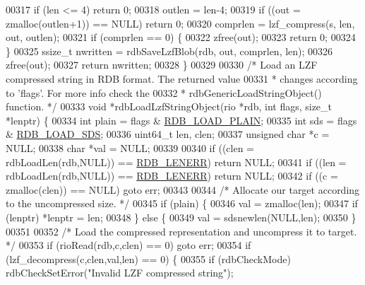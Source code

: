 \begin{DoxyCode}
{{{{{00317     \textcolor{keywordflow}{if} (len <= 4) \textcolor{keywordflow}{return} 0;
00318     outlen = len-4;
00319     \textcolor{keywordflow}{if} ((out = zmalloc(outlen+1)) == NULL) \textcolor{keywordflow}{return} 0;
00320     comprlen = lzf\_compress(s, len, out, outlen);
00321     \textcolor{keywordflow}{if} (comprlen == 0) \{
00322         zfree(out);
00323         \textcolor{keywordflow}{return} 0;
00324     \}
00325     ssize\_t nwritten = rdbSaveLzfBlob(rdb, out, comprlen, len);
00326     zfree(out);
00327     \textcolor{keywordflow}{return} nwritten;
00328 \}
00329 
00330 \textcolor{comment}{/* Load an LZF compressed string in RDB format. The returned value}
00331 \textcolor{comment}{ * changes according to 'flags'. For more info check the}
00332 \textcolor{comment}{ * rdbGenericLoadStringObject() function. */}
00333 \textcolor{keywordtype}{void} *rdbLoadLzfStringObject(rio *rdb, \textcolor{keywordtype}{int} flags, size\_t *lenptr) \{
00334     \textcolor{keywordtype}{int} plain = flags & \hyperlink{rdb_8h_a5579c0ff24afa891ad41006def040a25}{RDB\_LOAD\_PLAIN};
00335     \textcolor{keywordtype}{int} sds = flags & \hyperlink{rdb_8h_ad15f5cc8e1a7789cc35b66f017e98a18}{RDB\_LOAD\_SDS};
00336     uint64\_t len, clen;
00337     \textcolor{keywordtype}{unsigned} \textcolor{keywordtype}{char} *c = NULL;
00338     \textcolor{keywordtype}{char} *val = NULL;
00339 
00340     \textcolor{keywordflow}{if} ((clen = rdbLoadLen(rdb,NULL)) == \hyperlink{rdb_8h_aa66b6ad7261656029e6a67cf78432b2d}{RDB\_LENERR}) \textcolor{keywordflow}{return} NULL;
00341     \textcolor{keywordflow}{if} ((len = rdbLoadLen(rdb,NULL)) == \hyperlink{rdb_8h_aa66b6ad7261656029e6a67cf78432b2d}{RDB\_LENERR}) \textcolor{keywordflow}{return} NULL;
00342     \textcolor{keywordflow}{if} ((c = zmalloc(clen)) == NULL) \textcolor{keywordflow}{goto} err;
00343 
00344     \textcolor{comment}{/* Allocate our target according to the uncompressed size. */}
00345     \textcolor{keywordflow}{if} (plain) \{
00346         val = zmalloc(len);
00347         \textcolor{keywordflow}{if} (lenptr) *lenptr = len;
00348     \} \textcolor{keywordflow}{else} \{
00349         val = sdsnewlen(NULL,len);
00350     \}
00351 
00352     \textcolor{comment}{/* Load the compressed representation and uncompress it to target. */}
00353     \textcolor{keywordflow}{if} (rioRead(rdb,c,clen) == 0) \textcolor{keywordflow}{goto} err;
00354     \textcolor{keywordflow}{if} (lzf\_decompress(c,clen,val,len) == 0) \{
00355         \textcolor{keywordflow}{if} (rdbCheckMode) rdbCheckSetError(\textcolor{stringliteral}{"Invalid LZF compressed string"});
}}}}}
\end{DoxyCode}
